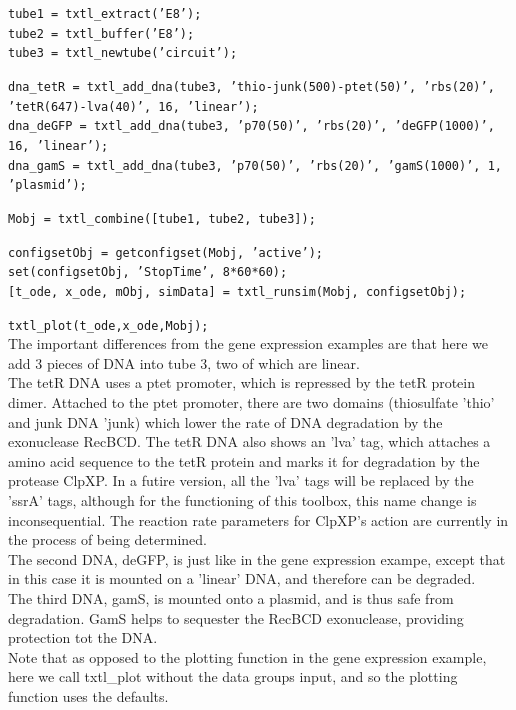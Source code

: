 \documentclass[english]{report}
\begin{document}
		\noindent \texttt{tube1 = txtl\_extract('E8');} \\
								\texttt{tube2 = txtl\_buffer('E8');} \\
								\texttt{tube3 = txtl\_newtube('circuit');} 
								\vspace*{1\baselineskip}
								
								\noindent \texttt{dna\_tetR = txtl\_add\_dna(tube3, 'thio-junk(500)-ptet(50)', 'rbs(20)', 'tetR(647)-lva(40)', 16, 'linear'); }\\
								\texttt{dna\_deGFP = txtl\_add\_dna(tube3, 'p70(50)', 'rbs(20)', 'deGFP(1000)', 16, 'linear');}\\
								\texttt{dna\_gamS = txtl\_add\_dna(tube3, 'p70(50)', 'rbs(20)', 'gamS(1000)', 1, 'plasmid');}
								\vspace*{1\baselineskip}
								
								\noindent \texttt{Mobj = txtl\_combine([tube1, tube2, tube3]);} 
								\vspace*{1\baselineskip}	
								
								\noindent \texttt{configsetObj = getconfigset(Mobj, 'active');}\\
								\texttt{set(configsetObj, 'StopTime', 8*60*60);}\\
								\texttt{[t\_ode, x\_ode, mObj, simData] = txtl\_runsim(Mobj, configsetObj);}
								\vspace*{1\baselineskip}
								
								\noindent \texttt{txtl\_plot(t\_ode,x\_ode,Mobj);} \\
		
		The important differences from the gene expression examples are that here we add 3 pieces of DNA into tube 3, two of which are linear. \\
		The tetR DNA uses a ptet promoter, which is repressed by the tetR protein dimer. Attached to the ptet promoter, there are two domains (thiosulfate 'thio' and junk DNA 'junk) which lower the rate of DNA degradation by the exonuclease RecBCD. The tetR DNA also shows an 'lva' tag, which attaches a amino acid sequence to the tetR protein and marks it for degradation by the protease ClpXP. In a futire version, all the 'lva' tags will be replaced by the 'ssrA' tags, although for the functioning of this toolbox, this name change is inconsequential. The reaction rate parameters for ClpXP's action are currently in the process of being determined. \\
		The second DNA, deGFP, is just like in the gene expression exampe, except that in this case it is mounted on a 'linear' DNA, and therefore can be degraded. \\ 
		The third DNA, gamS, is mounted onto a plasmid, and is thus safe from degradation. GamS helps to sequester the RecBCD exonuclease, providing protection tot the DNA. \\
		Note that as opposed to the plotting function in the gene expression example, here we call txtl\_plot without the data groups input, and so the plotting function uses the defaults. 
		
\end{document}
